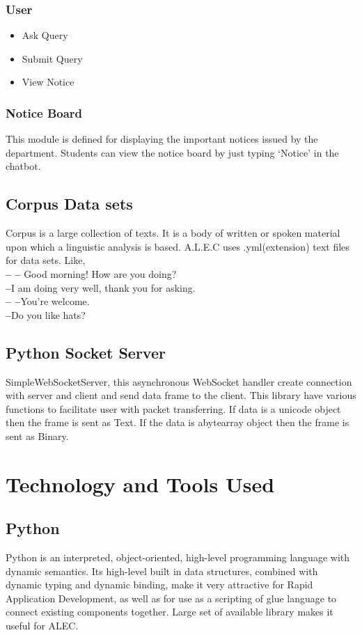 \documentclass{mnnit}
\begin{document}
\subsection{User}
\begin{itemize}
    \item Ask Query
    \item Submit Query
    \item View Notice
\end{itemize}
\subsection{Notice Board}
This module is defined for displaying the important notices issued by the department.  Students can view the notice board by just typing ‘Notice’ in the chatbot.

\section{Corpus Data sets}
Corpus is a large collection of texts.  It is a body of written or spoken material upon which a linguistic analysis is based.  A.L.E.C uses .yml(extension) text files for data sets.  Like,\\
{\textbf{-- --} Good morning! How are you doing?}\\
{\textbf{  --}I am doing very well, thank you for asking.}\\
{\textbf{-- --}You’re welcome.}\\
{\textbf{ --}Do you like hats?}


\section{Python Socket Server}
SimpleWebSocketServer, this asynchronous WebSocket handler create connection with server and client and send data frame to the client.  This library have various functions to facilitate user with packet transferring.  If data is a unicode object then the frame is sent as Text.  If the data is abytearray object then the frame is sent as Binary.

\chapter{Technology and Tools Used}
\section{Python}
Python is an interpreted, object-oriented, high-level programming language with dynamic semantics.  Its high-level built in data structures, combined with dynamic typing and dynamic binding, make it very attractive for Rapid Application Development, as well as for use as a scripting of glue language to connect existing components together.  Large set of available library makes it useful for ALEC.
\end{document}
